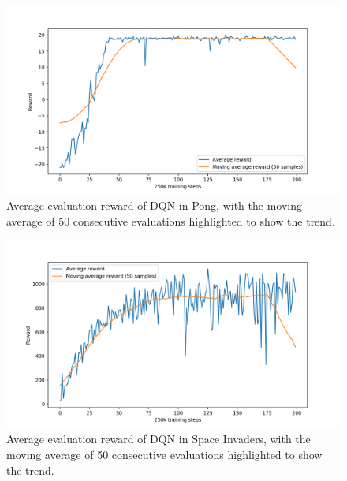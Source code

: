 \begin{figure}
    \includegraphics[width=\textwidth]{pictures/experiments/baseline_pong}
    \centering
    \caption[Average performance of DQN in Pong]{Average evaluation reward of DQN in
	    Pong, with the moving average of 50 consecutive evaluations highlighted
	    to show the trend.}
    \label{f:P_baseline}
\end{figure}
%
%
\begin{figure}
    \includegraphics[width=\textwidth]{pictures/experiments/baseline_space_invaders}
    \centering
    \caption[Average performance of DQN in Space Invaders]{Average evaluation reward
	    of DQN in Space Invaders, with the moving average of 50 consecutive 
	    evaluations highlighted to show the trend.}
    \label{f:SI_baseline}
\end{figure}
%


